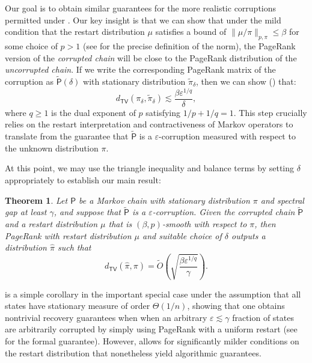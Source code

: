 \documentclass[11pt]{article}
\newtheorem{thm}{Theorem}[section]
\theoremstyle{remark}
\begin{document}
Our goal is to 
obtain similar guarantees for the more realistic corruptions permitted under . Our key insight is that we can show that 
under the mild condition that the restart distribution $\mu$ satisfies a bound of $\|\mu/\pi\|_{p,\pi}\leq \beta$ for some choice of $p>1$ (see  for the precise definition of the norm), the PageRank version of the \emph{corrupted chain} will be close to the PageRank distribution of the \emph{uncorrupted chain}. If we write the corresponding PageRank matrix of the corruption as $\widetilde{\mathsf{P}}(\delta)$ with stationary distribution $\widetilde{\pi}_{\delta}$, then we can show () that:
\begin{equation*}
    d_{\mathsf{TV}}(\pi_{\delta},\widetilde{\pi}_{\delta})\lesssim \frac{\beta\varepsilon^{1/q}}{\delta},
\end{equation*}
where $q\geq 1$ is the dual exponent of $p$ satisfying $1/p+1/q=1$. This step crucially relies on the restart interpretation and contractiveness of Markov operators to translate from the guarantee that $\widetilde{\mathsf{P}}$ is a $\varepsilon$-corruption measured with respect to the unknown distribution $\pi$.

At this point, we may use the triangle inequality and balance terms by setting $\delta$ appropriately to establish our main result:
\begin{thm}
\label{thm:intro_main}
     Let $\mathsf{P}$ be a Markov chain with stationary distribution $\pi$ and spectral gap at least $\gamma$, and suppose that $\widetilde{\mathsf{P}}$ is a $\varepsilon$-corruption. Given the corrupted chain $\widetilde{\mathsf{P}}$ and a restart distribution $\mu$ that is $(\beta,p)$-smooth with respect to $\pi$, then PageRank with restart distribution $\mu$ and suitable choice of $\delta$ outputs a distribution $\widehat{\pi}$ such that
    \begin{equation*}
        d_{\mathsf{TV}}(\widehat{\pi},\pi)=\widetilde{O}\left(\sqrt{\frac{\beta\varepsilon^{1/q}}{\gamma}}\right).
    \end{equation*}
\end{thm}

 is a simple corollary in the important special case under the assumption that all states have stationary measure of order $\Theta(1/n)$, showing that one obtains nontrivial recovery guarantees when when an arbitrary $\varepsilon\lesssim \gamma$ fraction of states are arbitrarily corrupted by simply using PageRank with a uniform restart (see  for the formal guarantee). However,  allows for significantly milder conditions on the restart distribution that nonetheless yield algorithmic guarantees.
\end{document}
